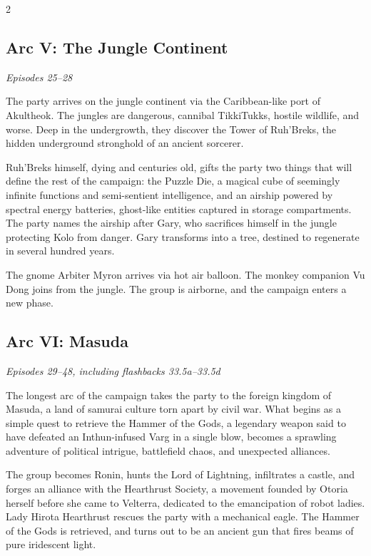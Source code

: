 \begin{multicols}{2}
\subsection*{Arc V: The Jungle Continent}
\textit{Episodes 25--28}

\medskip

\noindent
The party arrives on the jungle continent via the Caribbean-like port of Akultheok.  The jungles are dangerous, cannibal TikkiTukks, hostile wildlife, and worse.  Deep in the undergrowth, they discover the Tower of Ruh'Breks, the hidden underground stronghold of an ancient sorcerer.

Ruh'Breks himself, dying and centuries old, gifts the party two things that will define the rest of the campaign: the Puzzle Die, a magical cube of seemingly infinite functions and semi-sentient intelligence, and an airship powered by spectral energy batteries, ghost-like entities captured in storage compartments.  The party names the airship after Gary, who sacrifices himself in the jungle protecting Kolo from danger.  Gary transforms into a tree, destined to regenerate in several hundred years.

The gnome Arbiter Myron arrives via hot air balloon.  The monkey companion Vu Dong joins from the jungle.  The group is airborne, and the campaign enters a new phase.

\subsection*{Arc VI: Masuda}
\textit{Episodes 29--48, including flashbacks 33.5a--33.5d}

\medskip

\noindent
The longest arc of the campaign takes the party to the foreign kingdom of Masuda, a land of samurai culture torn apart by civil war.  What begins as a simple quest to retrieve the Hammer of the Gods, a legendary weapon said to have defeated an Inthun-infused Varg in a single blow, becomes a sprawling adventure of political intrigue, battlefield chaos, and unexpected alliances.

The group becomes Ronin, hunts the Lord of Lightning, infiltrates a castle, and forges an alliance with the Hearthrust Society, a movement founded by Otoria herself before she came to Velterra, dedicated to the emancipation of robot ladies.  Lady Hirota Hearthrust rescues the party with a mechanical eagle.  The Hammer of the Gods is retrieved, and turns out to be an ancient gun that fires beams of pure iridescent light.


\end{multicols}
